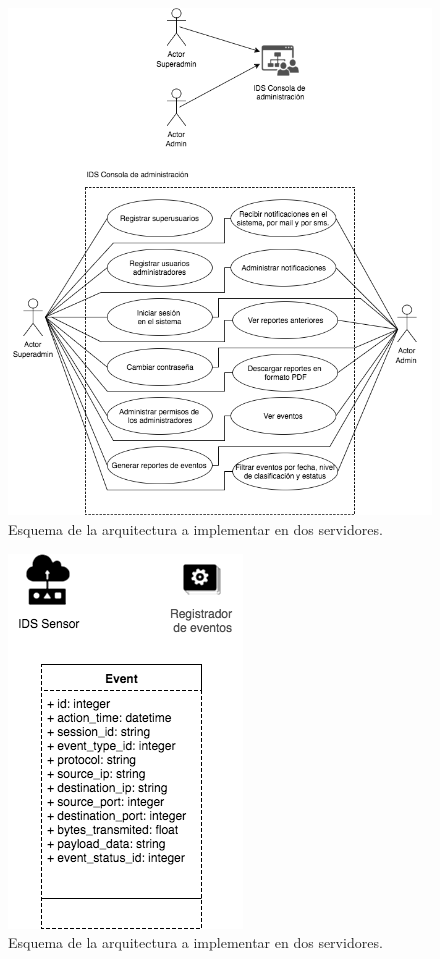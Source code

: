 \begin{figure}
	\centering
	\includegraphics[scale=.6]{images/Casos_de_uso_Report_Viewer}
	\caption{Esquema de la arquitectura a implementar en dos servidores.}
	\label{fig:ids_ucrv}
\end{figure}

\begin{figure}
	\centering
	\includegraphics[scale=.6]{images/Diagrama_Objetos_Sensor_IDS}
	\caption{Esquema de la arquitectura a implementar en dos servidores.}
	\label{fig:ids_doos}
\end{figure}

